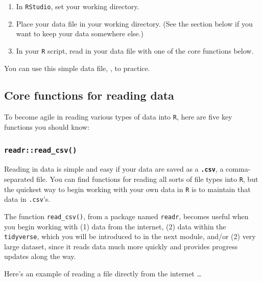 \documentclass[
]{book}
\providecommand{\tightlist}{%
  \setlength{\itemsep}{0pt}\setlength{\parskip}{0pt}}
\begin{document}
\begin{enumerate}
\def\labelenumi{\arabic{enumi}.}
\tightlist
\item
  In \texttt{RStudio}, set your working directory.
\item
  Place your data file in your working directory. (See the section below if you want to keep your data somewhere else.)
\item
  In your \texttt{R} script, read in your data file with one of the core functions below.
\end{enumerate}

You can use this simple data file, , to practice.

\subsection*{Core functions for reading data}\label{core-functions-for-reading-data}

To become agile in reading various types of data into \texttt{R}, here are five key functions you should know:

\subsubsection*{\texorpdfstring{\texttt{readr::read\_csv()}}{readr::read\_csv()}}\label{readrread_csv}

Reading in data is simple and easy if your data are saved as a \textbf{\texttt{.csv}}, a comma-separated file. You can find functions for reading all sorts of file types into \texttt{R}, but the quickest way to begin working with your own data in \texttt{R} is to maintain that data in \texttt{.csv}'s.

The function \texttt{read\_csv()}, from a package named \texttt{readr}, becomes useful when you begin working with (1) data from the internet, (2) data within the \texttt{tidyverse}, which you will be introduced to in the next module, and/or (2) very large dataset, since it reads data much more quickly and provides progress updates along the way.

Here's an example of reading a file directly from the internet \ldots{}
\end{document}
